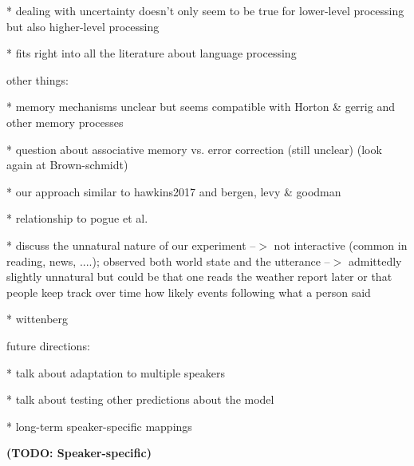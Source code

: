 \documentclass[lucida,biblatex]{sp} %
\newcommand{\todo}[1]{}
\renewcommand{\todo}[1]{{\bf \color{red} (TODO: {#1})}}
\begin{document}
 	 * dealing with uncertainty doesn't only seem to be true for lower-level processing but also higher-level processing
	 
	  * fits right into all the literature about language processing
	
	other things:
	
	*  memory mechanisms unclear but seems compatible with Horton \& gerrig and other memory processes
	
	* question about associative memory vs. error correction (still unclear) (look again at Brown-schmidt)
	
 	*  our approach similar to hawkins2017 and bergen, levy \& goodman
	
	*  relationship to pogue et al.
	
	*  discuss the unnatural nature of our experiment --$>$ not interactive (common in reading, news, ....); observed both world state
	     and the utterance --$>$ admittedly slightly unnatural but could be that one reads the weather report later or that people keep track
	     over time how likely events following what a person said
	     
       * wittenberg


future directions:

* talk about adaptation to multiple speakers

* talk about testing other predictions about the model

* long-term speaker-specific mappings
	
\todo{Speaker-specific}


\printbibliography
%



\end{document}
